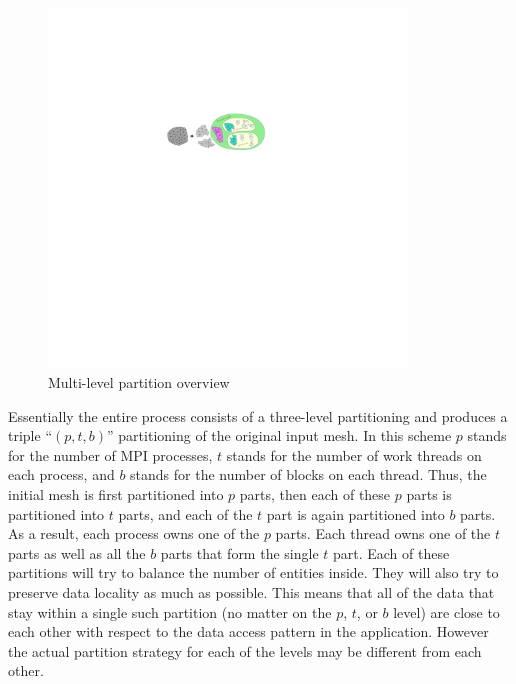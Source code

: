 \documentclass{article}
\begin{document}
\begin{figure}[h]
  \begin{center}
    \includegraphics[width=0.85\textwidth]{multi-partition}
    \caption{Multi-level partition overview\label{fig:mltp}}
  \end{center}
\end{figure}

Essentially the entire process consists of a three-level partitioning
and produces a triple ``$(p,t,b)$'' partitioning of the original input
mesh.  In this scheme $p$ stands for the number of MPI processes, $t$
stands for the number of work threads on each process, and $b$ stands
for the number of blocks on each thread.  Thus, the initial mesh is
first partitioned into $p$ parts, then each of these $p$ parts is
partitioned into $t$ parts, and each of the $t$ part is again
partitioned into $b$ parts.  As a result, each process owns one of the
$p$ parts.  Each thread owns one of the $t$ parts as well as all the $b$
parts that form the single $t$ part.  Each of these partitions will try
to balance the number of entities inside.  They will also try to
preserve data locality as much as possible.  This means that all of the
data that stay within a single such partition (no matter on the $p$,
$t$, or $b$ level) are close to each other with respect to the data
access pattern in the application.  However the actual partition
strategy for each of the levels may be different from each other.  
\end{document}
